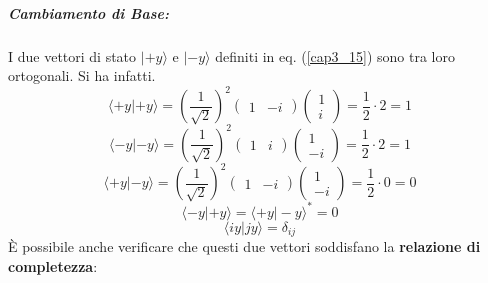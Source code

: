 \documentclass[a4paper,12pt,oneside]{book}
\begin{document}
\subparagraph{Cambiamento di Base:}
I due vettori di stato $| +y \rangle $ e $| -y \rangle$ definiti in eq. (\ref{cap3_15}) sono tra loro ortogonali. Si ha infatti.
	\begin{equation}
		\langle +y | +y \rangle=\left(\frac{1}{\sqrt{2}}\right)^2
		\begin{pmatrix}
		1 & -i
		\end{pmatrix}
		\begin{pmatrix}
		1 \\
		i
		\end{pmatrix}=
		\frac{1}{2}\cdot 2= 1
	\end{equation}
	\begin{equation}
		\langle -y | -y \rangle =\left(\frac{1}{\sqrt{2}}\right)^2
		\begin{pmatrix}
		1 & i
		\end{pmatrix}
		\begin{pmatrix}
1 \\
-i
\end{pmatrix}=
		\frac{1}{2}\cdot 2= 1
	\end{equation}
		\begin{equation}
		\langle +y | -y \rangle =\left(\frac{1}{\sqrt{2}}\right)^2
		\begin{pmatrix}
		1 & -i
		\end{pmatrix}
		\begin{pmatrix}
		1 \\
		-i
		\end{pmatrix}=
		\frac{1}{2}\cdot 0= 0
	\end{equation}
	\begin{equation}
		\langle -y | +y \rangle = \langle +y | -y \rangle ^*=0
	\end{equation}
	\begin{equation}
		\langle iy | jy \rangle = \delta_{ij}
	\end{equation}
È possibile anche verificare che questi due vettori soddisfano la \textbf{relazione di completezza}:
\end{document}
